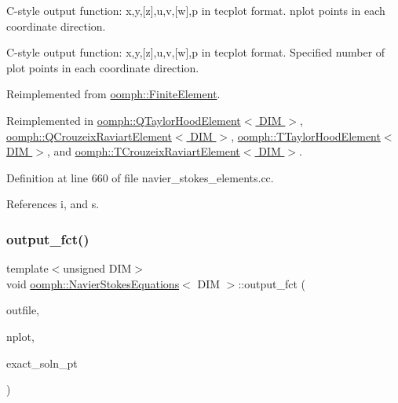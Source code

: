 C-\/style output function\+: x,y,\mbox{[}z\mbox{]},u,v,\mbox{[}w\mbox{]},p in tecplot format. nplot points in each coordinate direction. 

C-\/style output function\+: x,y,\mbox{[}z\mbox{]},u,v,\mbox{[}w\mbox{]},p in tecplot format. Specified number of plot points in each coordinate direction. 

Reimplemented from \hyperlink{classoomph_1_1FiniteElement_adfaee690bb0608f03320eeb9d110d48c}{oomph\+::\+Finite\+Element}.



Reimplemented in \hyperlink{classoomph_1_1QTaylorHoodElement_a0544106fc73db26d59619f6303b5803c}{oomph\+::\+Q\+Taylor\+Hood\+Element$<$ D\+I\+M $>$}, \hyperlink{classoomph_1_1QCrouzeixRaviartElement_a81470fac7a7ea2b58653db52af63ad00}{oomph\+::\+Q\+Crouzeix\+Raviart\+Element$<$ D\+I\+M $>$}, \hyperlink{classoomph_1_1TTaylorHoodElement_ab7aa0a74ee8fd566b95d3681f2240c62}{oomph\+::\+T\+Taylor\+Hood\+Element$<$ D\+I\+M $>$}, and \hyperlink{classoomph_1_1TCrouzeixRaviartElement_af32d21ac6a3e2909b40c3b2ac0c48430}{oomph\+::\+T\+Crouzeix\+Raviart\+Element$<$ D\+I\+M $>$}.



Definition at line 660 of file navier\+\_\+stokes\+\_\+elements.\+cc.



References i, and s.

\mbox{\label{classoomph_1_1NavierStokesEquations_afcfdf3272b9ab0c0baf1508e47164c06}} 
\subsubsection{\texorpdfstring{output\+\_\+fct()}{output\_fct()}\hspace{0.1cm}{\footnotesize\ttfamily [1/2]}}
{\footnotesize\ttfamily template$<$unsigned D\+IM$>$ \\
void \hyperlink{classoomph_1_1NavierStokesEquations}{oomph\+::\+Navier\+Stokes\+Equations}$<$ D\+IM $>$\+::output\+\_\+fct (\begin{DoxyParamCaption}\item[{std\+::ostream \&}]{outfile,  }\item[{const unsigned \&}]{nplot,  }\item[{\hyperlink{classoomph_1_1FiniteElement_a690fd33af26cc3e84f39bba6d5a85202}{Finite\+Element\+::\+Steady\+Exact\+Solution\+Fct\+Pt}}]{exact\+\_\+soln\+\_\+pt }\end{DoxyParamCaption})\hspace{0.3cm}{\ttfamily [virtual]}}



